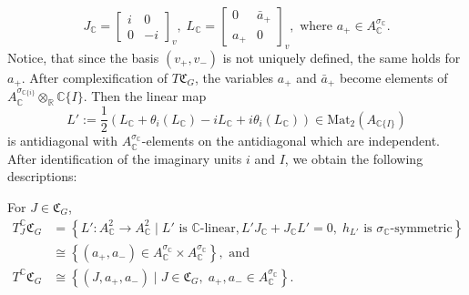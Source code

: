 \documentclass[oneside,11pt]{amsart}
\theoremstyle{definition}
\theoremstyle{remark}
\numberwithin{thm}{section}
\numberwithin{equation}{section}
\begin{document}
\begin{equation}\label{eqn:form of J and L}
J_\mathbb C=\begin{bmatrix}
i & 0 \\
0 & -i
\end{bmatrix}_v,\; L_\mathbb C=\begin{bmatrix}
    0 & \bar a_+ \\
    a_+ & 0
\end{bmatrix}_v,\text{ where }a_+\in A_\mathbb C^{\sigma_\mathbb C}.
\end{equation}
Notice, that since the basis $(v_+,v_-)$ is not uniquely defined, the same holds for $a_+$. After complexification of $T\mathfrak{C}_G$, the variables $a_+$ and $\bar a_+$ become elements of $A_\mathbb C^{\sigma_{\mathbb C\{i\}}}\otimes_\mathbb R\mathbb C\{I\}$. Then the linear map 
\begin{equation}\label{splitting_lin_map}L':=\frac{1}{2}(L_\mathbb C+\theta_i(L_\mathbb C)-iL_\mathbb C+i\theta_i(L_\mathbb C))\in\mathrm{Mat}_2(A_{\mathbb C\{I\}})
\end{equation}
is antidiagonal with $A_\mathbb{C}^{\sigma_\mathbb C}$-elements on the antidiagonal which are independent. After identification of the imaginary units $i$ and $I$, we obtain the following descriptions:

\noindent For $J\in\mathfrak{C}_G$, 
\begin{align}
 T^{\mathbb C}_J\mathfrak{C}_G& =\left\{L'\colon A_\mathbb C^2\to A_\mathbb C^2 \mid L'\text{ is $\mathbb C$-linear}, L'J_\mathbb C+J_\mathbb CL'=0,\;h_{L'}\text{ is $\sigma_\mathbb C$-symmetric}\right\}  \nonumber \\
  & \cong \left\{(a_+,a_-)\in A_\mathbb C^{\sigma_\mathbb C}\times A_\mathbb C^{\sigma_\mathbb C}\right\}, \text{ and }\label{formula:complexified tangent bundle_cx str model} \\
 T^{\mathbb C}\mathfrak{C}_G& \cong\left\{(J,a_+,a_-)\mid J\in\mathfrak{C}_G,\;a_+,a_-\in A_\mathbb C^{\sigma_\mathbb C}\right\}. \nonumber
\end{align}
\end{document}
